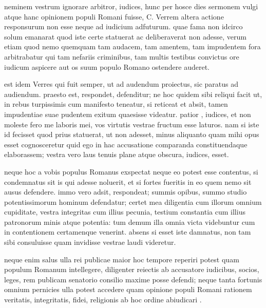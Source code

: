 
 neminem vestrum ignorare arbitror, iudices, hunc per hosce dies sermonem vulgi atque hanc opinionem populi Romani fuisse, C. Verrem altera actione responsurum non esse neque ad iudicium adfuturum. quae fama non idcirco solum emanarat quod iste certe statuerat ac deliberaverat non adesse, verum etiam quod nemo quemquam tam audacem, tam amentem, tam impudentem fora arbitrabatur qui tam nefariis criminibus, tam multis testibus convictus ore iudicum aspicere aut os suum populo Romano ostendere auderet.

 est idem Verres qui fuit semper, ut ad audendum proiectus, sic paratus ad audiendum. praesto est, respondet, defenditur; ne hoc quidem sibi reliqui facit ut, in rebus turpissimis cum manifesto teneatur, si reticeat et absit, tamen impudentiae suae pudentem exitum quaesisse videatur. patior , iudices, et non moleste fero me laboris mei, vos virtutis vestrae fructum esse laturos. nam si iste id fecisset quod prius statuerat, ut non adesset, minus aliquanto quam mihi opus esset cognosceretur quid ego in hac accusatione comparanda constituendaque elaborassem; vestra vero laus tenuis plane atque obscura, iudices, esset.

 neque hoc a vobis populus Romanus exspectat neque eo potest esse contentus, si condemnatus sit is qui adesse noluerit, et si fortes fueritis in eo quem nemo sit ausus defendere. immo vero adsit, respondeat; summis opibus, summo studio potentissimorum hominum defendatur; certet mea diligentia cum illorum omnium cupiditate, vestra integritas cum illius pecunia, testium constantia cum illius patronorum minis atque potentia: tum demum illa omnia victa videbuntur cum in contentionem certamenque venerint. absens si esset iste damnatus, non tam sibi consuluisse quam invidisse vestrae laudi videretur.

 neque enim salus ulla rei publicae maior hoc tempore reperiri potest quam populum Romanum intellegere, diligenter reiectis ab accusatore iudicibus, socios, leges, rem publicam senatorio consilio maxime posse defendi; neque tanta fortunis omnium pernicies ulla potest accedere quam opinione populi Romani rationem veritatis, integritatis, fidei, religionis ab hoc ordine abiudicari .

